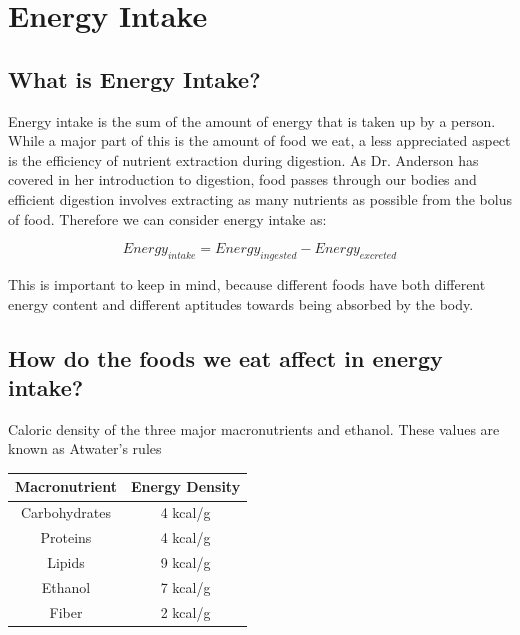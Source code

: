 \documentclass{tufte-handout}
\begin{document}
\section{Energy Intake}

\subsection{What is Energy Intake?}
Energy intake is the sum of the amount of energy that is taken up by a person.  While a major part of this is the amount of food we eat, a less appreciated aspect is the efficiency of nutrient extraction during digestion.  As Dr. Anderson has covered in her introduction to digestion, food passes through our bodies and efficient digestion involves extracting as many nutrients as possible from the bolus of food.  Therefore we can consider energy intake as:

\begin{equation}
Energy_{intake} = Energy_{ingested} - Energy_{excreted}
\end{equation}

This is important to keep in mind, because different foods have both different energy content and different aptitudes towards being absorbed by the body.

\subsection{How do the foods we eat affect in energy intake?}

\begin{margintable}
\centering
\caption{Caloric density of the three major macronutrients and ethanol.  These values are known as Atwater's rules}
\label{tab:atwater-values}
\begin{tabular}{cc}
\hline
\textbf{Macronutrient}       & \textbf{Energy Density}                     \\
\hline
Carbohydrates & 4 kcal/g \\
Proteins & 4 kcal/g \\
Lipids & 9 kcal/g \\
Ethanol & 7 kcal/g \\
Fiber & 2 kcal/g \\

\hline
\end{tabular}
\end{margintable}
\end{document}
